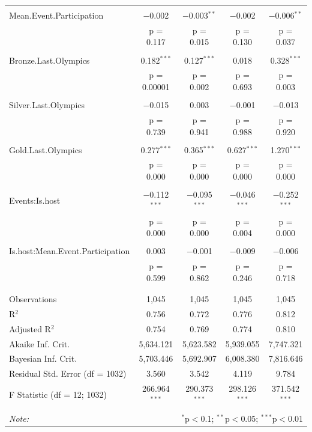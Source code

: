 \documentclass{mcmthesis}
\begin{document}
\begin{longtable}{@{\extracolsep{5pt}}lcccc}
  & & & & \\ 
 Mean.Event.Participation & $-$0.002 & $-$0.003$^{**}$ & $-$0.002 & $-$0.006$^{**}$ \\ 
  & p = 0.117 & p = 0.015 & p = 0.130 & p = 0.037 \\ 
  & & & & \\ 
 Bronze.Last.Olympics & 0.182$^{***}$ & 0.127$^{***}$ & 0.018 & 0.328$^{***}$ \\ 
  & p = 0.00001 & p = 0.002 & p = 0.693 & p = 0.003 \\ 
  & & & & \\ 
 Silver.Last.Olympics & $-$0.015 & 0.003 & $-$0.001 & $-$0.013 \\ 
  & p = 0.739 & p = 0.941 & p = 0.988 & p = 0.920 \\ 
  & & & & \\ 
 Gold.Last.Olympics & 0.277$^{***}$ & 0.365$^{***}$ & 0.627$^{***}$ & 1.270$^{***}$ \\ 
  & p = 0.000 & p = 0.000 & p = 0.000 & p = 0.000 \\ 
  & & & & \\ 
 Events:Is.host & $-$0.112$^{***}$ & $-$0.095$^{***}$ & $-$0.046$^{***}$ & $-$0.252$^{***}$ \\ 
  & p = 0.000 & p = 0.000 & p = 0.004 & p = 0.000 \\ 
  & & & & \\ 
 Is.host:Mean.Event.Participation & 0.003 & $-$0.001 & $-$0.009 & $-$0.006 \\ 
  & p = 0.599 & p = 0.862 & p = 0.246 & p = 0.718 \\ 
  & & & & \\ 
\hline \\[-1.8ex] 
Observations & 1,045 & 1,045 & 1,045 & 1,045 \\ 
R$^{2}$ & 0.756 & 0.772 & 0.776 & 0.812 \\ 
Adjusted R$^{2}$ & 0.754 & 0.769 & 0.774 & 0.810 \\ 
Akaike Inf. Crit. & 5,634.121 & 5,623.582 & 5,939.055 & 7,747.321 \\ 
Bayesian Inf. Crit. & 5,703.446 & 5,692.907 & 6,008.380 & 7,816.646 \\ 
Residual Std. Error (df = 1032) & 3.560 & 3.542 & 4.119 & 9.784 \\ 
F Statistic (df = 12; 1032) & 266.964$^{***}$ & 290.373$^{***}$ & 298.126$^{***}$ & 371.542$^{***}$ \\ 
\hline 
\hline \\[-1.8ex] 
\textit{Note:}  & \multicolumn{4}{r}{$^{*}$p$<$0.1; $^{**}$p$<$0.05; $^{***}$p$<$0.01} \\ 
\end{longtable} 
\end{document}
